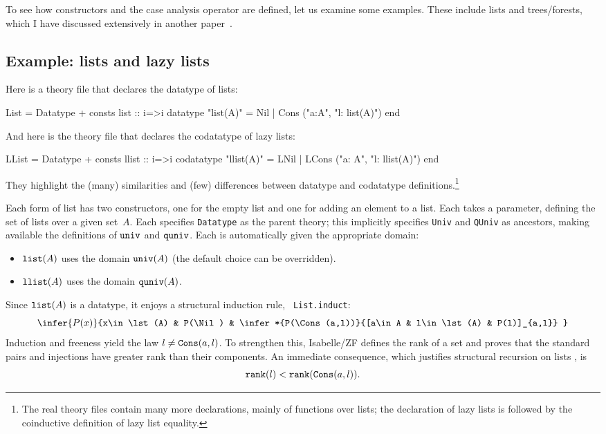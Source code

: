 To see how constructors and the case analysis operator are defined, let us
examine some examples.  These include lists and trees/forests, which I have
discussed extensively in another paper~\cite{paulson-set-II}.


\subsection{Example: lists and lazy lists}\label{lists-sec}
Here is a theory file that declares the datatype of lists:
\begin{ttbox} 
List = Datatype + 
consts  list :: i=>i
datatype "list(A)" = Nil | Cons ("a:A", "l: list(A)")
end
\end{ttbox}
And here is the theory file that declares the codatatype of lazy lists:
\begin{ttbox}
LList = Datatype + 
consts  llist :: i=>i
codatatype "llist(A)" = LNil | LCons ("a: A", "l: llist(A)")
end
\end{ttbox}
They highlight the (many) similarities and (few) differences between
datatype and codatatype definitions.\footnote{The real theory files contain
  many more declarations, mainly of functions over lists; the declaration
  of lazy lists is followed by the coinductive definition of lazy list
  equality.} 

Each form of list has two constructors, one for the empty list and one for
adding an element to a list.  Each takes a parameter, defining the set of
lists over a given set~$A$.  Each specifies {\tt Datatype} as the parent
theory; this implicitly specifies {\tt Univ} and {\tt QUniv} as ancestors,
making available the definitions of $\hbox{\tt univ}$ and $\hbox{\tt quniv}$.  Each is
automatically given the appropriate domain:
\begin{itemize}
\item $\hbox{\tt list}(A)$ uses the domain $\hbox{\tt univ}(A)$ (the default choice can be
  overridden). 

\item $\hbox{\tt llist}(A)$ uses the domain $\hbox{\tt quniv}(A)$.
\end{itemize}

Since $\hbox{\tt list}(A)$ is a datatype, it enjoys a structural induction rule, {\tt
  List.induct}:
\[ \infer{P(x)}{x\in\lst(A) & P(\Nil)
        & \infer*{P(\Cons(a,l))}{[a\in A & l\in\lst(A) & P(l)]_{a,l}} }
\] 
Induction and freeness yield the law $l\not=\hbox{\tt Cons}(a,l)$.  To strengthen this,
Isabelle/ZF defines the rank of a set and proves that the standard pairs and
injections have greater rank than their components.  An immediate consequence,
which justifies structural recursion on lists \cite[\S4.3]{paulson-set-II},
is
\[ \hbox{\tt rank}(l) < \hbox{\tt rank}(\hbox{\tt Cons}(a,l)). \]

